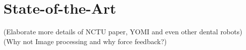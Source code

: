 \chapter{State-of-the-Art}
(Elaborate more details of NCTU paper, YOMI and even other dental robots)			\\
(Why not Image processing and why force feedback?)								